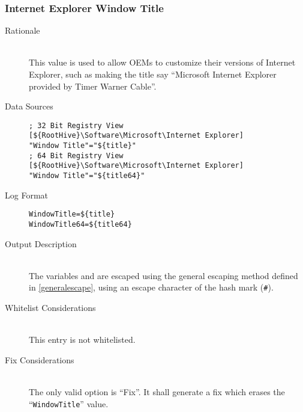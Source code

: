 \subsubsection{Internet Explorer Window Title}
\begin{description}
\item[Rationale]  \hfill \\ This value is used to allow OEMs to customize their
versions of Internet Explorer, such as making the title say ``Microsoft Internet
Explorer provided by Timer Warner Cable''.

\item[Data Sources] \hfill
\vspace{-\baselineskip}
\begin{verbatim}
; 32 Bit Registry View
[${RootHive}\Software\Microsoft\Internet Explorer]
"Window Title"="${title}"
; 64 Bit Registry View
[${RootHive}\Software\Microsoft\Internet Explorer]
"Window Title"="${title64}"
\end{verbatim}
\item[Log Format] \hfill
\vspace{-\baselineskip}
\begin{verbatim} 
WindowTitle=${title}
WindowTitle64=${title64}
\end{verbatim}
\item[Output Description] \hfill \\
The variables  and  are escaped using the general
escaping method defined in \ref{generalescape}, using an escape character of
the hash mark (\verb|#|).
\item[Whitelist Considerations] \hfill \\
This entry is not whitelisted.
\item[Fix Considerations] \hfill \\
The only valid option is ``Fix''. It shall generate a fix which erases the
``\verb|WindowTitle|'' value.
\end{description}

